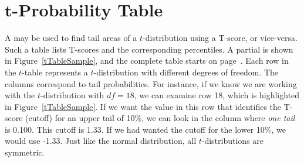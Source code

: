 \section{$\mathbf{t}$-Probability Table}
\label{tDistributionTable}

A  may be used to
find tail areas of a $t$-distribution using a T-score,
or vice-versa.
Such a table lists T-scores and the corresponding percentiles.
A partial  is shown in Figure~\ref{tTableSample},
and the complete table starts on page~\pageref{tTableFirstPage}.
Each row in the $t$-table represents a $t$-distribution with
different degrees of freedom.
The columns correspond to tail probabilities.
For instance, if we know we are working with the
$t$-distribution with $df=18$, we can examine row 18,
which is highlighted in Figure~\ref{tTableSample}.
If we want the value in this row that identifies the T-score
(cutoff) for an upper tail of 10\%, we can look in the column
where \emph{one tail} is 0.100.
This cutoff is 1.33.
If we had wanted the cutoff for the lower 10\%, we would
use -1.33.
Just like the normal distribution,
all $t$-distributions are symmetric.

